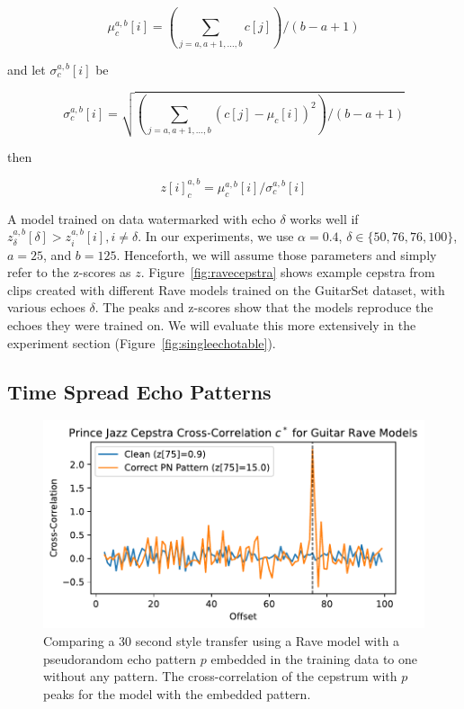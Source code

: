 \documentclass[letterpaper]{article} %
\begin{document}
\begin{equation}
    \mu_{c}^{a,b}[i] = \left( \sum_{j=a, a+1, ..., b} c[j] \right) / (b-a+1)
\end{equation}

and let $\sigma_{c}^{a,b}[i]$ be 

\begin{equation}
    \sigma_{c}^{a,b}[i] = \sqrt{ \left( \sum_{j=a, a+1, ..., b} (c[j] - \mu_c[i])^2 \right) / (b-a+1)}
\end{equation}

then

\begin{equation}
    \label{eq:zscore}
    z[i]_{c}^{a,b} = \mu_{c}^{a,b}[i] / \sigma_{c}^{a,b}[i]
\end{equation}


A model trained on data watermarked with echo $\delta$ works well if $z^{a,b}_{\delta}[\delta] > z^{a,b}_{i}[i], i \neq \delta$.  In our experiments, we use $\alpha = 0.4$, $\delta \in \{50, 76, 76, 100\}$, $a=25$, and $b=125$.  Henceforth, we will assume those parameters and simply refer to the z-scores as $z$.  Figure~\ref{fig:ravecepstra} shows example cepstra from clips created with different Rave\cite{caillon2021rave} models trained on the GuitarSet \cite{xi2018guitarset} dataset, with various echoes $\delta$.  The peaks and z-scores show that the models reproduce the echoes they were trained on.  We will evaluate this more extensively in the experiment section (Figure~\ref{fig:singleechotable}).

\subsection{Time Spread Echo Patterns}

\begin{figure}
    \centering
    \includegraphics[width=\columnwidth]{figs/RavePNCepstra.pdf}
    \caption{Comparing a 30 second style transfer using a Rave model with a pseudorandom echo pattern $p$ embedded in the training data to one without any pattern.  The cross-correlation of the cepstrum with $p$ peaks for the model with the embedded pattern. }
    \label{fig:ravepncepstra}
\end{figure}
\end{document}
